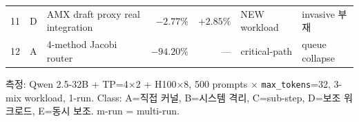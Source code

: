 \begin{table}[t]
{\begin{tabular}{@{}clp{4.6cm}rrll@{}}
11         & D          & AMX draft proxy real integration         & $-2.77\%$           & $+2.85\%$           & NEW workload        & invasive 부재 \\
12         & A          & 4-method Jacobi router                   & $-94.20\%$          & ---                 & critical-path       & queue collapse \\
\bottomrule
\end{tabular}%
}
\smallskip
\par\noindent\scriptsize 측정: Qwen 2.5-32B + TP=4$\times$2 + H100$\times$8, 500 prompts $\times$ \texttt{max\_tokens}=32, 3-mix workload, 1-run. Class: A=직접 커널, B=시스템 격리, C=sub-step, D=보조 워크로드, E=동시 보조. m-run = multi-run.
\end{table}
